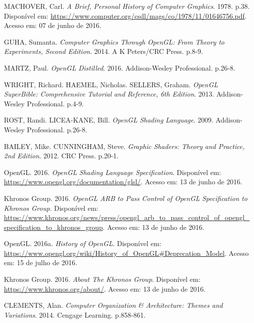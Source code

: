 \documentclass[brazil,ruledheader]{abntifes}
\begin{document}
\begin{thebibliography}{1}
\makeatletter
\renewcommand\@biblabel[1]{}
\makeatother

MACHOVER, Carl. \textit{A Brief, Personal History of Computer Graphics}. 1978. p.38. Disponível em: \url{https://www.computer.org/csdl/mags/co/1978/11/01646756.pdf}.
Acesso em: 07 de junho de 2016.

GUHA, Sumanta. \textit{Computer Graphics Through OpenGL: From Theory to Experiments, Second Edition}. 2014. A K Peters/CRC Press. p.8-9.

MARTZ, Paul. \textit{OpenGL Distilled}. 2016. Addison-Wesley Professional. p.26-8.

WRIGHT, Richard. HAEMEL, Nicholas. SELLERS, Graham. \textit{OpenGL SuperBible: Comprehensive Tutorial and Reference, 6th Edition}. 2013. Addison-Wesley Professional. p.4-9.

ROST, Randi. LICEA-KANE, Bill. \textit{OpenGL Shading Language}. 2009. Addison-Wesley Professional. p.26-8.


BAILEY, Mike. CUNNINGHAM, Steve. \textit{Graphic Shaders: Theory and Practice, 2nd Edition}. 2012. CRC Press. p.20-1.

OpenGL. 2016. \textit{OpenGL Shading Language Specification}. Disponível em: \url{https://www.opengl.org/documentation/glsl/}.
Acesso em: 13 de junho de 2016.

Khronos Group. 2016. \textit{OpenGL ARB to Pass Control of OpenGL Specification to Khronos Group}. Disponível em: \url{https://www.khronos.org/news/press/opengl_arb_to_pass_control_of_opengl_specification_to_khronos_group}.
Acesso em: 13 de junho de 2016.

OpenGL. 2016a. \textit{History of OpenGL}. Disponível em: \url{https://www.opengl.org/wiki/History_of_OpenGL#Deprecation_Model}.
Acesso em: 15 de julho de 2016.

Khronos Group. 2016. \textit{About The Khronos Group}. Disponível em: \url{https://www.khronos.org/about/}.
Acesso em: 13 de junho de 2016.


CLEMENTS, Alan. \textit{Computer Organization \& Architecture: Themes and Variations}. 2014. Cengage Learning. p.858-861.


\end{thebibliography}
\end{document}
